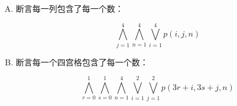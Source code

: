 {{\begin{practices}
\begin{enumerate}[A.]
{                    \[
                        \bigwedge^{4}_{i = 1}\bigwedge^{4}_{n = 1}\bigvee^{4}_{j = 1} p(i, j, n)
                    \]
                }
                \item
                {
                    断言每一列包含了每一个数：

                    \[
                        \bigwedge^{4}_{j = 1}\bigwedge^{4}_{n = 1}\bigvee^{4}_{i = 1} p(i, j, n)
                    \]
                }
                \item
                {
                    断言每一个四宫格包含了每一个数：

                    \[
                        \bigwedge^{1}_{r = 0}\bigwedge^{1}_{s = 0}\bigwedge^{4}_{n = 1}\bigvee^{2}_{i = 1}\bigvee^{2}_{j = 1} p(3r + i, 3s + j, n)
                    \]
                }
            \end{enumerate}
        \end{practices}
    }
}
